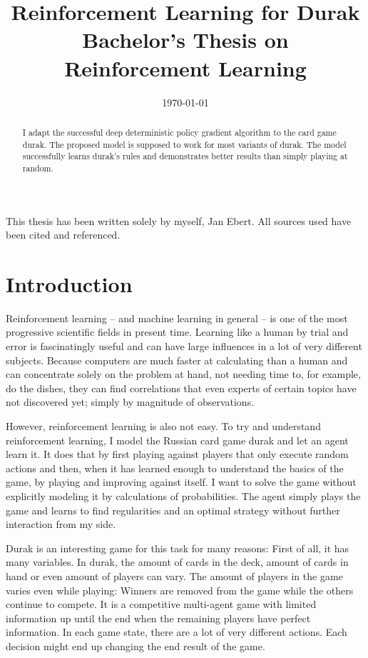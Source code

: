 \documentclass[a4paper,titlepage]{article}
\title{Reinforcement Learning for Durak \\ \medskip \large{Bachelor's Thesis on Reinforcement Learning}}
\date{\today}
\begin{document}
\maketitle

\setcounter{page}{2}
\thispagestyle{empty}
\noindent
This thesis has been written solely by myself, Jan Ebert. All sources used have been cited and referenced.

\begin{abstract}
\setcounter{page}{3}
I adapt the successful deep deterministic policy gradient algorithm to the card game durak. The proposed model is supposed to work for most variants of durak. The model successfully learns durak's rules and demonstrates better results than simply playing at random.
\end{abstract}

\setcounter{page}{4}
\thispagestyle{empty}
\tableofcontents

\newpage


\section{Introduction}

Reinforcement learning -- and machine learning in general -- is one of the most progressive scientific fields in present time. Learning like a human by trial and error is fascinatingly useful and can have large influences in a lot of very different subjects. Because computers are much faster at calculating than a human and can concentrate solely on the problem at hand, not needing time to, for example, do the dishes, they can find correlations that even experts of certain topics have not discovered yet; simply by magnitude of observations.

However, reinforcement learning is also not easy. To try and understand reinforcement learning, I model the Russian card game durak and let an agent learn it. It does that by first playing against players that only execute random actions and then, when it has learned enough to understand the basics of the game, by playing and improving against itself. I want to solve the game without explicitly modeling it by calculations of probabilities. The agent simply plays the game and learns to find regularities and an optimal strategy without further interaction from my side.

Durak is an interesting game for this task for many reasons: First of all, it has many variables. In durak, the amount of cards in the deck, amount of cards in hand or even amount of players can vary. The amount of players in the game varies even while playing: Winners are removed from the game while the others continue to compete. It is a competitive multi-agent game with limited information up until the end when the remaining players have perfect information. In each game state, there are a lot of very different actions. Each decision might end up changing the end result of the game.
\end{document}
